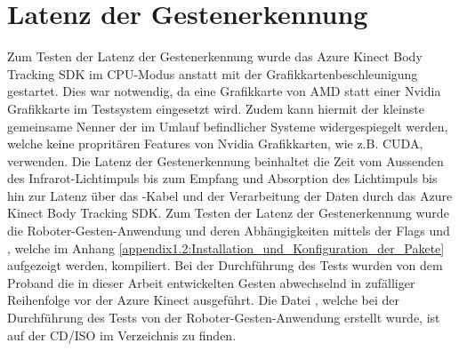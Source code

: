












\section{Latenz der Gestenerkennung}
Zum Testen der Latenz der Gestenerkennung wurde das Azure Kinect Body Tracking SDK im CPU-Modus anstatt mit der Grafikkartenbeschleunigung gestartet. Dies war notwendig, da eine Grafikkarte von AMD statt einer Nvidia Grafikkarte im Testsystem eingesetzt wird. Zudem kann hiermit der kleinste gemeinsame Nenner der im Umlauf befindlicher Systeme widergespiegelt werden, welche keine propritären Features von Nvidia Grafikkarten, wie z.B. CUDA, verwenden. Die Latenz der Gestenerkennung beinhaltet die Zeit vom Aussenden des Infrarot-Lichtimpuls bis zum Empfang und Absorption des Lichtimpuls bis hin zur Latenz über das -Kabel und der Verarbeitung der Daten durch das Azure Kinect Body Tracking SDK. Zum Testen der Latenz der Gestenerkennung wurde die Roboter-Gesten-Anwendung und deren Abhängigkeiten mittels der Flags  und , welche im Anhang \ref{appendix1.2:Installation_und_Konfiguration_der_Pakete} aufgezeigt werden, kompiliert. Bei der Durchführung des Tests wurden von dem Proband die in dieser Arbeit entwickelten Gesten abwechselnd in zufälliger Reihenfolge vor der Azure Kinect ausgeführt. Die Datei , welche bei der Durchführung des Tests von der Roboter-Gesten-Anwendung erstellt wurde, ist auf der CD/ISO im Verzeichnis  zu finden.

